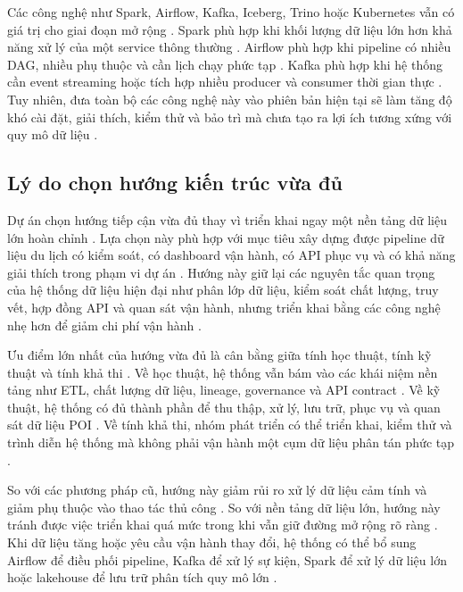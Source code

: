\documentclass[12pt,a4paper]{article}
\begin{document}
Các công nghệ như Spark, Airflow, Kafka, Iceberg, Trino hoặc Kubernetes vẫn có giá trị cho giai đoạn mở rộng \cite{sparkDocs}. Spark phù hợp khi khối lượng dữ liệu lớn hơn khả năng xử lý của một service thông thường \cite{sparkDocs}. Airflow phù hợp khi pipeline có nhiều DAG, nhiều phụ thuộc và cần lịch chạy phức tạp \cite{airflowDocs}. Kafka phù hợp khi hệ thống cần event streaming hoặc tích hợp nhiều producer và consumer thời gian thực \cite{awsStreaming}. Tuy nhiên, đưa toàn bộ các công nghệ này vào phiên bản hiện tại sẽ làm tăng độ khó cài đặt, giải thích, kiểm thử và bảo trì mà chưa tạo ra lợi ích tương xứng với quy mô dữ liệu \cite{dockerCompose}.\par

\subsection{Lý do chọn hướng kiến trúc vừa đủ}

Dự án chọn hướng tiếp cận vừa đủ thay vì triển khai ngay một nền tảng dữ liệu lớn hoàn chỉnh \cite{armbrust2021}. Lựa chọn này phù hợp với mục tiêu xây dựng được pipeline dữ liệu du lịch có kiểm soát, có dashboard vận hành, có API phục vụ và có khả năng giải thích trong phạm vi dự án \cite{ibmETL}. Hướng này giữ lại các nguyên tắc quan trọng của hệ thống dữ liệu hiện đại như phân lớp dữ liệu, kiểm soát chất lượng, truy vết, hợp đồng API và quan sát vận hành, nhưng triển khai bằng các công nghệ nhẹ hơn để giảm chi phí vận hành \cite{damaDmbok}.\par

Ưu điểm lớn nhất của hướng vừa đủ là cân bằng giữa tính học thuật, tính kỹ thuật và tính khả thi \cite{ibmWarehouseLake}. Về học thuật, hệ thống vẫn bám vào các khái niệm nền tảng như ETL, chất lượng dữ liệu, lineage, governance và API contract \cite{damaDmbok}. Về kỹ thuật, hệ thống có đủ thành phần để thu thập, xử lý, lưu trữ, phục vụ và quan sát dữ liệu POI \cite{ibmETL}. Về tính khả thi, nhóm phát triển có thể triển khai, kiểm thử và trình diễn hệ thống mà không phải vận hành một cụm dữ liệu phân tán phức tạp \cite{dockerCompose}.\par

So với các phương pháp cũ, hướng này giảm rủi ro xử lý dữ liệu cảm tính và giảm phụ thuộc vào thao tác thủ công \cite{ibmDataQuality}. So với nền tảng dữ liệu lớn, hướng này tránh được việc triển khai quá mức trong khi vẫn giữ đường mở rộng rõ ràng \cite{armbrust2021}. Khi dữ liệu tăng hoặc yêu cầu vận hành thay đổi, hệ thống có thể bổ sung Airflow để điều phối pipeline, Kafka để xử lý sự kiện, Spark để xử lý dữ liệu lớn hoặc lakehouse để lưu trữ phân tích quy mô lớn \cite{airflowDocs}.\par
\end{document}
